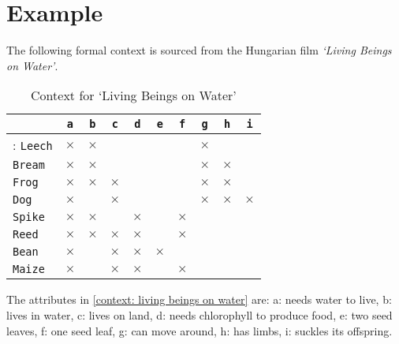 \section{Example}
\label{section: example}

\begin{example}
	The following formal context is sourced from the Hungarian film \textit{`Living Beings on Water'}.
	\small{
		\begin{table}[htbp]
			\centering
			\begin{tabular}{lccccccccc}
				               & \texttt{a} & \texttt{b} & \texttt{c} & \texttt{d} & \texttt{e} & \texttt{f} & \texttt{g} & \texttt{h} & \texttt{i} \\
				\midrule:
				\texttt{Leech} & $\times$   & $\times$   &            &            &            &            & $\times$   &            &            \\
				\midrule
				\texttt{Bream} & $\times$   & $\times$   &            &            &            &            & $\times$   & $\times$   &            \\
				\midrule
				\texttt{Frog}  & $\times$   & $\times$   & $\times$   &            &            &            & $\times$   & $\times$   &            \\
				\midrule
				\texttt{Dog}   & $\times$   &            & $\times$   &            &            &            & $\times$   & $\times$   & $\times$   \\
				\midrule
				\texttt{Spike} & $\times$   & $\times$   &            & $\times$   &            & $\times$   &            &            &            \\
				\midrule
				\texttt{Reed}  & $\times$   & $\times$   & $\times$   & $\times$   &            & $\times$   &            &            &            \\
				\midrule
				\texttt{Bean}  & $\times$   &            & $\times$   & $\times$   & $\times$   &            &            &            &            \\
				\midrule
				\texttt{Maize} & $\times$   &            & $\times$   & $\times$   &            & $\times$   &            &            &            \\
			\end{tabular}
			\caption{Context for `Living Beings on Water'}
			\label{context: living beings on water}
		\end{table}
	}
	The attributes in \autoref{context: living beings on water} are: a: needs water to live, b: lives in water, c: lives on land, d: needs chlorophyll to produce food, e: two seed leaves, f: one seed leaf, g: can move around, h: has limbs, i: suckles its offspring.

\end{example}

